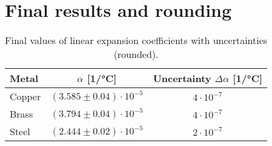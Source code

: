 \section{Final results and rounding}

\begin{table}[H]
\centering
\begin{tabular}{l c c}
\toprule
Metal & $\alpha$ [1/°C] & Uncertainty $\Delta\alpha$ [1/°C] \\
\midrule
Copper & \( (3.585 \pm 0.04)\cdot 10^{-5}\) & \(4\cdot10^{-7}\) \\
Brass  & \( (3.794 \pm 0.04)\cdot 10^{-5}\) & \(4\cdot10^{-7}\) \\
Steel  & \( (2.444 \pm 0.02)\cdot 10^{-5}\) & \(2\cdot10^{-7}\) \\
\bottomrule
\end{tabular}
\caption{Final values of linear expansion coefficients with uncertainties (rounded).}
\end{table}
